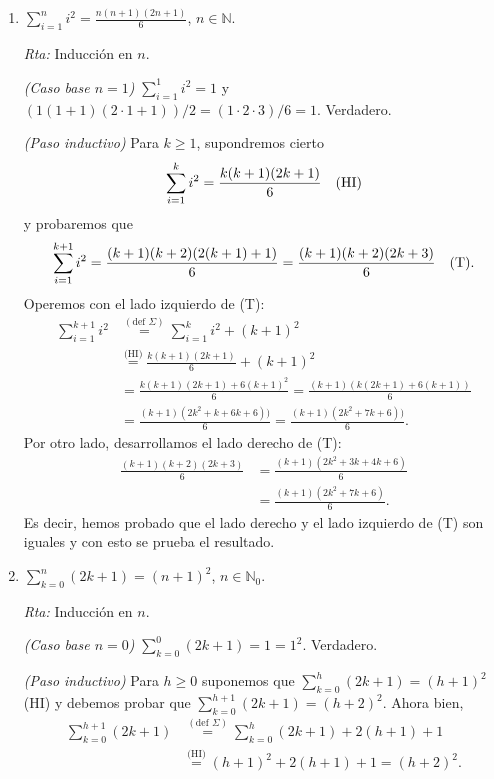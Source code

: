 \documentclass[a4paper,12pt,twoside,spanish,reqno]{amsbook}
\numberwithin{equation}{section}
\newcommand{\rta}{\noindent\textit{Rta: }}
\begin{document}
\begin{enumerate}
\begin{enumerate}
            \item\label{ej-sum-i2}  $\displaystyle{ \sum_{i=1}^n i^2 = \frac{n(n+1)(2n+1)}{6}}$, $n\in \mathbb N$.
            
            \rta Inducción en $n$.
            
            \textit{(Caso base $n=1$) } $ \sum_{i=1}^1 i^2 = 1$ y $(1  (1+1)  (2\cdot 1 + 1))/2 = (1 \cdot 2 \cdot 3)/6=1$. Verdadero.  
            
            \textit{(Paso inductivo) } Para  $k \ge 1$,  supondremos cierto 
            $$\sum_{i=1}^{k} i^2 = \frac{k(k+1)(2k+1)}{6} \text{\quad (HI)}$$
            y probaremos que 
            $$\sum_{i=1}^{k+1} i^2 = \frac{(k+1)(k+2)(2(k+1)+1)}{6} = \frac{(k+1)(k+2)(2k+3)}{6} \text{\quad (T)}.$$ 
            Operemos con el lado izquierdo de (T):
            \begin{align*}
            \sum_{i=1}^{k+1} i^2 &\overset{(\text{def } \Sigma)}{=} \sum_{i=1}^{k} i^2 + (k+1)^2 \\ &\overset{\text{(HI)}}{=} \frac{k(k+1)(2k+1)}{6}  + (k+1)^2 \\ &=   \frac{k(k+1)(2k+1) + 6(k+1)^2}{6} = \frac{(k+1)(k(2k+1) + 6(k+1))}{6} \\ &= \frac{(k+1)(2k^2+k + 6k+6))}{6} =  \frac{(k+1)(2k^2+7k+6))}{6}.
            \end{align*}
            Por otro lado,  desarrollamos el lado derecho de (T): 
            \begin{align*}
                \frac{(k+1)(k+2)(2k+3)}{6} &= \frac{(k+1)(2k^2+3k +4k +6)}{6} \\&= \frac{(k+1)(2k^2+7k +6)}{6}.
            \end{align*}
            Es decir,  hemos probado que el lado derecho y el lado izquierdo de (T) son iguales y con esto se prueba el resultado. 
            
            \item  $\displaystyle{ \sum_{k=0}^n (2k+1) = (n+1)^2}$, $n\in \mathbb N_0$.
            
            \rta Inducción en $n$.
            
            \textit{(Caso base $n=0$) } $\sum_{k=0}^0 (2k+1) = 1 = 1^2$. Verdadero.
            
            \textit{(Paso inductivo) } Para $h \ge 0$ suponemos que $\sum_{k=0}^h (2k+1) = (h+1)^2$ (HI) y debemos probar que $\sum_{k=0}^{h+1} (2k+1) = (h+2)^2$. Ahora bien, 
            \begin{align*}
                \sum_{k=0}^{h+1} (2k+1) &\overset{(\text{def } \Sigma)}{=} \sum_{k=0}^h (2k+1) + 2(h+1) +1 \\ &\overset{\text{(HI)}}{=}  (h+1)^2 + 2(h+1) +1 = (h+2)^2.
            \end{align*}
            

\end{enumerate}
\end{enumerate}
\end{document}
